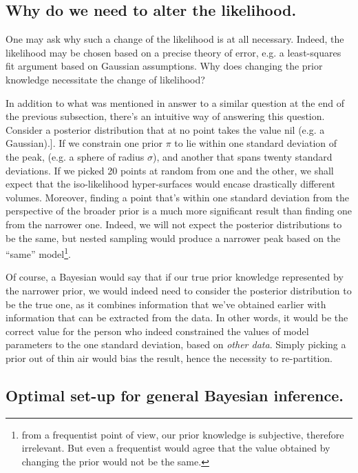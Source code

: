 \documentclass[usenatbib]{mnras}
\begin{document}
\subsection{Why do we need to alter the likelihood.}
\label{sec:orgb2dac6c}
One may ask why such a change of the likelihood is at all
necessary. Indeed, the likelihood may be chosen based on a precise
theory of error, e.g. a least-squares fit argument based on
Gaussian assumptions. Why does changing the prior knowledge
necessitate the change of likelihood?

In addition to what was mentioned in answer to a similar question
at the end of the previous subsection, there's an intuitive way of
answering this question. Consider a posterior distribution that at
no point takes the value nil (e.g. a Gaussian).]. If we constrain one
prior \(\pi\) to lie within one standard deviation of the peak,
(e.g. a sphere of radius \(\sigma\)), and another that spans twenty
standard deviations. If we picked 20 points at random from one and
the other, we shall expect that the iso-likelihood hyper-surfaces
would encase drastically different volumes. Moreover, finding a
point that's within one standard deviation from the perspective of
the broader prior is a much more significant result than finding
one from the narrower one. Indeed, we will not expect the posterior
distributions to be the same, but nested sampling would produce a
narrower peak based on the ``same'' model\footnote{from a frequentist point of view, our prior knowledge is
subjective, therefore irrelevant. But even a frequentist would agree
that the value obtained by changing the prior would not be the same.}. 

Of course, a Bayesian would say that if our true prior knowledge
represented by the narrower prior, we would indeed need to
consider the posterior distribution to be the true one, as it
combines information that we've obtained earlier with information
that can be extracted from the data. In other words, it would be
the correct value for the person who indeed constrained the values
of model parameters to the one standard deviation, based on \emph{other
data}. Simply picking a prior out of thin air would bias the
result, hence the necessity to re-partition. 

\subsection{Optimal set-up for general Bayesian inference.}
\label{sec:org55cf4ae}
\end{document}
